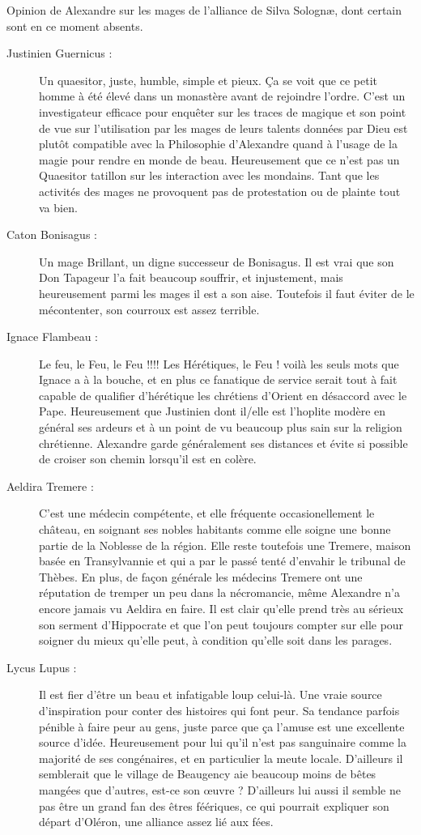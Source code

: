 Opinion de Alexandre sur les mages de l'alliance de Silva Solognæ, dont certain sont en ce moment absents.
\begin{description}
\item[Justinien Guernicus :] Un quaesitor, juste, humble, simple et pieux. Ça se voit que ce petit homme à été élevé dans un monastère avant de rejoindre l'ordre. C'est un investigateur efficace pour enquêter sur les traces de magique et son point de vue sur l'utilisation par les mages de leurs talents données par Dieu est plutôt compatible avec la Philosophie d'Alexandre quand à l'usage de la magie pour rendre en monde de beau. Heureusement que ce n'est pas un Quaesitor tatillon sur les interaction avec les mondains. Tant que les activités des mages ne provoquent pas de protestation ou de plainte tout va bien.
\item[Caton Bonisagus :] Un mage Brillant, un digne successeur de Bonisagus. Il est vrai que son Don Tapageur l'a fait beaucoup souffrir, et injustement, mais heureusement parmi les mages il est a son aise. Toutefois il faut éviter de le mécontenter, son courroux est assez terrible.
\item[Ignace Flambeau :] \og Le feu, le Feu, le Feu !!!! Les Hérétiques, le Feu ! \fg{} voilà les seuls mots que Ignace a à la bouche, et en plus ce fanatique de service serait tout à fait capable de qualifier d'hérétique les chrétiens d'Orient en désaccord avec le Pape. Heureusement que Justinien dont il/elle est l'hoplite modère en général ses ardeurs et à un point de vu beaucoup plus sain sur la religion chrétienne. Alexandre garde généralement ses distances et évite si possible de croiser son chemin lorsqu'il est en colère.
\item[Aeldira Tremere :] C'est une médecin compétente, et elle fréquente occasionellement le château, en soignant ses nobles habitants comme elle soigne une bonne partie de la Noblesse de la région. Elle reste toutefois une Tremere, maison basée en Transylvannie et qui a par le passé tenté d'envahir le tribunal de Thèbes. En plus, de façon générale les médecins Tremere ont une réputation de tremper un peu dans la nécromancie, même Alexandre n'a encore jamais vu Aeldira en faire. Il est clair qu'elle prend très au sérieux son serment d'Hippocrate et que l'on peut toujours compter sur elle pour soigner du mieux qu'elle peut, à condition qu'elle soit dans les parages.
\item[Lycus Lupus :] Il est fier d'être un beau et infatigable loup celui-là. Une vraie source d'inspiration pour conter des histoires qui font peur. Sa tendance parfois pénible à faire peur au gens, juste parce que ça l'amuse est une excellente source d'idée. Heureusement pour lui qu'il n'est pas sanguinaire comme la majorité de ses congénaires, et en particulier la meute locale. D'ailleurs il semblerait que le village de Beaugency aie beaucoup moins de bêtes mangées que d'autres, est-ce son œuvre ? D'ailleurs lui aussi il semble ne pas être un grand fan des êtres féériques, ce qui pourrait expliquer son départ d'Oléron, une alliance assez lié aux fées.

\end{description}
